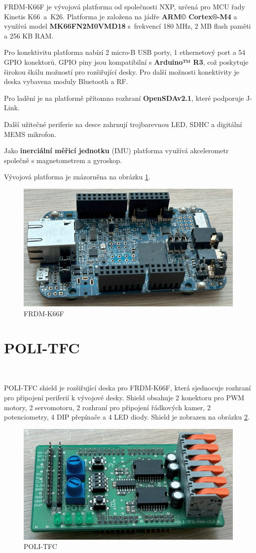 FRDM-K66F je vývojová platforma od společnosti NXP, určená pro MCU řady Kinetis K66~a~K26.
Platforma je založena na jádře \textbf{ARM© Cortex®-M4} a využívá model \textbf{MK66FN2M0VMD18} s~frekvencí 180 MHz, 2 MB flash paměti a 256 KB RAM.

Pro konektivitu platforma nabízí 2 micro-B USB porty, 1 ethernetový port a 54 GPIO konektorů.
GPIO piny jsou kompatibilní s \textbf{Arduino™ R3}, což poskytuje širokou škálu možností pro rozšiřující desky.
Pro další možnosti konektivity je deska vybavena moduly Bluetooth a RF.

Pro ladění je na platformě přítomno rozhraní \textbf{OpenSDAv2.1}, které podporuje J-Link.

Další užitečné periferie na desce zahrnují trojbarevnou LED, SDHC a
digitální MEMS mikrofon.

Jako \textbf{inerciální měřicí jednotku} (IMU) platforma využívá akcelerometr společně s
magnetometrem a gyroskop\cite{frdmk66UserGuide}.

Vývojová platforma je znázorněna na obrázku \ref{fig:FRDM-K66F}.
\begin{figure}[!h]
    \centering
    \includegraphics[width = .5\linewidth]{Figures/FRDM-K66F.png}
    \caption{FRDM-K66F}
    \label{fig:FRDM-K66F}
    \vspace{-20pt}
\end{figure}

\section{POLI-TFC}
\label{sec:POLI-TFC}\

POLI-TFC shield je rozšiřující deska pro FRDM-K66F, která sjednocuje rozhraní pro
připojení periferií k vývojové desky. Shield obsahuje 2 konektoru pro PWM motory,
2 servomotoru, 2 rozhraní pro připojení řádkových kamer,
2 potenciometry, 4 DIP přepínače a 4 LED diody.
Shield je zobrazen na obrázku \ref{fig:POLI-TFC}.
\begin{figure}[!h]
    \centering
    \includegraphics[width = .4\linewidth]{Figures/POLI-TFC.png}
    \caption{POLI-TFC}
    \label{fig:POLI-TFC}
    \vspace{-15pt}
\end{figure}
